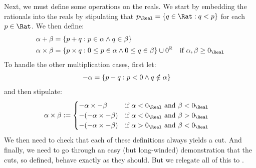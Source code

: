 \documentclass[../../../include/open-logic-section]{subfiles}
\begin{document}
Next, we must define some operations on the reals. We start by
embedding the rationals into the reals by stipulating that $p_\Real =
\Setabs{q \in \Rat}{q < p}$ for each $p \in \Rat$. We then define:
\begin{align*}
	\alpha + \beta &= \Setabs{p + q}{p \in \alpha \land q \in \beta}\\
	\alpha \times \beta &= 
	\Setabs{p \times q}{0 \leq p \in \alpha \land 0 \leq q \in \beta} \cup 0^\mathbb{R} & \text{if }\alpha, \beta \geq 0_\Real
\end{align*}
To handle the other multiplication cases, first let: %
\begin{align*}
	-\alpha &= \Setabs{p - q}{p < 0 \land q \notin \alpha}
\end{align*}
and then stipulate:
\begin{align*}
	\alpha \times \beta &:= 
	\begin{cases}
		\mathord{-}\alpha \times \mathord{-}\beta &\text{if }\alpha < 0_\Real\text{ and }\beta < 0_\Real\\
		\mathord{-}(\mathord{-}\alpha \times \mathord{-}\beta) &\text{if }\alpha < 0_\Real \text{ and }\beta > 0_\Real\\
		\mathord{-}(\mathord{-}\alpha \times \mathord{-}\beta) &\text{if }\alpha > 0_\Real \text{ and }\beta < 0_\Real
	\end{cases}
\end{align*}
We then need to check that each of these definitions always yields a
cut. And finally, we need to go through an easy (but long-winded)
demonstration that the cuts, so defined, behave exactly as they
should. But we relegate all of this to .
\end{document}
